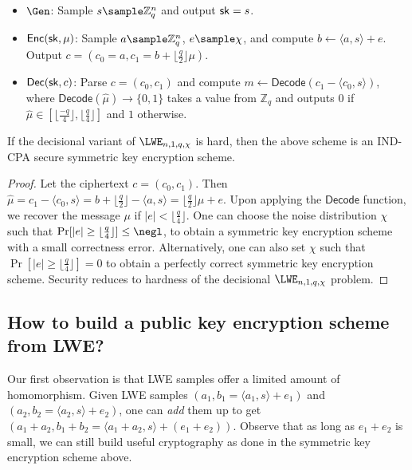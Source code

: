 \begin{itemize}
    \item $\Gen$: Sample $s \sample \mathbb{Z}_q^n$ and output $\mathsf{sk} = s$.
    \item $\mathsf{Enc}(\mathsf{sk},\mu)$: Sample $a \sample \mathbb{Z}_q^n$, $e \sample \chi$, and compute $b \gets \langle a, s \rangle + e$. Output $c = (c_0 = a, c_1 = b + \lfloor\frac{q}{2}\rfloor\mu)$.
    \item $\mathsf{Dec}(\mathsf{sk},c)$: Parse $c = (c_0, c_1)$ and compute $m \gets \mathsf{Decode}(c_1 - \langle c_0, s \rangle)$, where $\mathsf{Decode}(\hat{\mu}) \to \{0,1\}$ takes a value from $\mathbb{Z}_q$ and outputs $0$ if $\hat{\mu} \in [\lfloor\frac{-q}{4}\rfloor, \lfloor\frac{q}{4}\rfloor]$ and $1$ otherwise.
\end{itemize}

\begin{theorem}
    If the decisional variant of $\LWE_{n,1,q,\chi}$ is hard, then the above scheme is an IND-CPA secure symmetric key encryption scheme.
\end{theorem}
\begin{proof}
    Let the ciphertext $c = (c_0, c_1)$. Then $\hat{\mu} = c_1 - \langle c_0,s\rangle = b + \lfloor\frac{q}{2}\rfloor - \langle a,s\rangle = \lfloor\frac{q}{2}\rfloor\mu + e$. Upon applying the $\mathsf{Decode}$ function, we recover the message $\mu$ if $|e| < \lfloor\frac{q}{4}\rfloor$.
    One can choose the noise distribution $\chi$ such that
    $\Pr[|e| \geq \lfloor\frac{q}{4}\rfloor] \leq \negl$, to obtain a symmetric key encryption scheme with a small correctness error. Alternatively, one can also set $\chi$ such that $\Pr[|e| \geq \lfloor\frac{q}{4}\rfloor] = 0$ to obtain a perfectly correct symmetric key encryption scheme.
    Security reduces to hardness of the decisional $\LWE_{n,1,q,\chi}$ problem.
\end{proof}

\subsection{How to build a public key encryption scheme from LWE?}
Our first observation is that LWE samples offer a limited amount of homomorphism. Given LWE samples $(a_1, b_1 = \langle a_1, s\rangle + e_1)$ and $(a_2, b_2 = \langle a_2, s\rangle + e_2)$, one can \emph{add} them up to get $(a_1 + a_2, b_1 + b_2 = \langle a_1 + a_2, s\rangle + (e_1+e_2))$. Observe that as long as $e_1 + e_2$ is small, we can still build useful cryptography as done in the symmetric key encryption scheme above.

